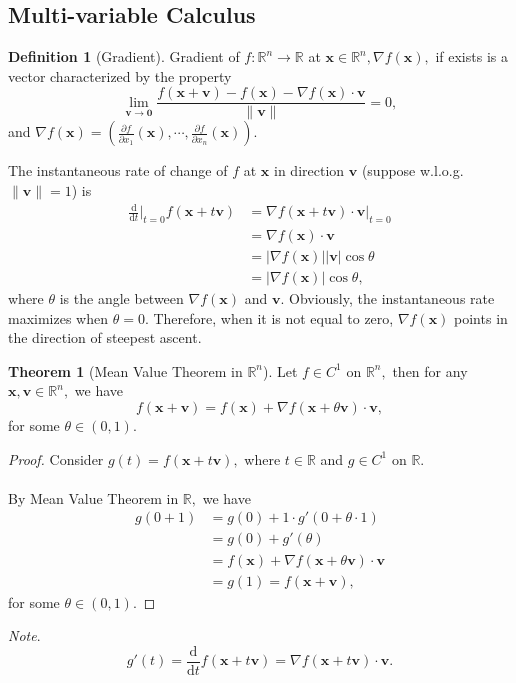 \documentclass[12pt]{article}
\theoremstyle{definition}
\theoremstyle{definition}
\newtheorem{thm}{Theorem}[section]
\theoremstyle{definition}
\theoremstyle{definition}
\theoremstyle{definition}
\newtheorem{definition}{Definition}[section]
\begin{document}
\subsection{Multi-variable Calculus}
\begin{definition}[Gradient]
	Gradient of $f: \mathbb{R}^n \to \mathbb{R}$ at $\mathbf{x}\in\mathbb{R}^n, \nabla f(\mathbf{x}),$ if exists is a vector characterized by the property $$\lim_{\mathbf{v}\to\mathbf{0}}\frac{f(\mathbf{x}+\mathbf{v})-f(\mathbf{x})-\nabla f(\mathbf{x})\cdot\mathbf{v}}{\|\mathbf{v}\|}=0,$$ and $\nabla f(\mathbf{x})=\left(\frac{\partial f}{\partial x_1}(\mathbf{x}), \cdots, \frac{\partial f}{\partial x_n}(\mathbf{x})\right).$
\end{definition}

\noindent The instantaneous rate of change of $f$ at $\mathbf{x}$ in direction $\mathbf{v}$ (suppose w.l.o.g. $\|\mathbf{v}\|=1$) is $$\begin{aligned}\frac{\mathrm{d}}{\mathrm{d}t}\bigg|_{t=0}f(\mathbf{x}+t\mathbf{v})&=\nabla f(\mathbf{x}+t\mathbf{v})\cdot\mathbf{v}|_{t=0}\\&=\nabla f(\mathbf{x})\cdot\mathbf{v}\\&=|\nabla f(\mathbf{x})||\mathbf{v}|\cos\theta\\&=|\nabla f(\mathbf{x})|\cos\theta,\end{aligned}$$ where $\theta$ is the angle between $\nabla f(\mathbf{x})$ and $\mathbf{v}.$ Obviously, the instantaneous rate maximizes when $\theta=0.$ Therefore, when it is not equal to zero, $\nabla f(\mathbf{x})$ points in the direction of steepest ascent.

\begin{thm}[Mean Value Theorem in $\mathbb{R}^n$]
	Let $f \in C^1$ on $\mathbb{R}^n,$ then for any $\mathbf{x}, \mathbf{v} \in \mathbb{R}^n,$ we have $$f(\mathbf{x}+\mathbf{v})=f(\mathbf{x})+\nabla f(\mathbf{x}+\theta\mathbf{v})\cdot\mathbf{v},$$ for some $\theta\in(0, 1).$
\end{thm}
\begin{proof}
	Consider $g(t)=f(\mathbf{x}+t\mathbf{v}),$ where $t\in\mathbb{R}$ and $g \in C^1$ on $\mathbb{R}.$
	\\\\ By Mean Value Theorem in $\mathbb{R},$ we have $$\begin{aligned}g(0+1)&=g(0)+1 \cdot g'(0+\theta\cdot1)\\&=g(0)+g'(\theta)\\&=f(\mathbf{x})+\nabla f(\mathbf{x}+\theta\mathbf{v})\cdot\mathbf{v}\\&=g(1)=f(\mathbf{x}+\mathbf{v}),\end{aligned}$$ for some $\theta\in(0, 1).$
\end{proof}
\noindent \emph{Note}. $$g'(t)=\frac{\mathrm{d}}{\mathrm{d}t}f(\mathbf{x}+t\mathbf{v})=\nabla f(\mathbf{x}+t\mathbf{v})\cdot\mathbf{v}.$$
\end{document}
